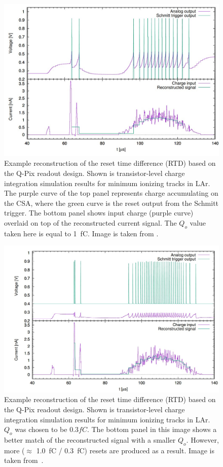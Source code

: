 \begin{figure}[]
\centering
\includegraphics[width=\textwidth]{images/qpix_rtd_reconstruction_example.jpg}
\caption{Example reconstruction of the reset time difference (RTD) based on the Q-Pix readout design. 
Shown is transistor-level charge integration simulation results for minimum ionizing tracks in LAr.
The purple curve of the top panel represents charge accumulating on the CSA, where the green curve is the reset output from the Schmitt trigger.
The bottom panel shows input charge (purple curve) overlaid on top of the reconstructed current signal.
The $Q_{o}$ value taken here is equal to 1~\unit{fC}.
Image is taken from \citep{qpix:nygren:mei}.}
\label{fig:qpixRecon1}
\end{figure}

\begin{figure}[]
\centering
\includegraphics[width=\textwidth]{images/qpix_rtd_reconstruction_example_03fc.jpg}
\caption{Example reconstruction of the reset time difference (RTD) based on the Q-Pix readout design.
Shown is transistor-level charge integration simulation results for minimum ionizing tracks in LAr.
$Q_{o}$ was chosen to be $0.3 fC$.
The bottom panel in this image shows a better match of the reconstructed signal with a smaller $Q_{o}$. 
However, more ($\approx$ 1.0~\unit{fC} / 0.3~\unit{fC}) resets are produced as a result. 
Image is taken from~\citep{qpix:nygren:mei}.}
\label{fig:qpixRecon2}
\end{figure}

